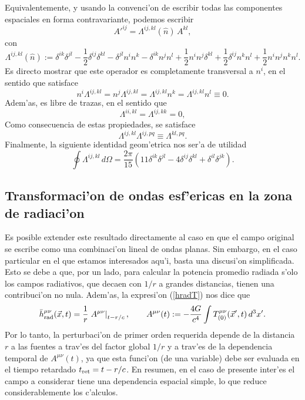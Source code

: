 Equivalentemente, y usando la convenci'on de escribir todas las componentes espaciales en forma contravariante, podemos escribir
\begin{equation}
A'^{ij}=\Lambda^{ij,kl}(\hat{n})\,A^{kl},
\end{equation}
con
\begin{equation}
\Lambda^{ij,kl}(\hat{n}):=\delta^{ik}\delta^{jl}-\frac{1}{2}\delta^{ij}\delta^{kl}-\delta^{jl}n^in^k-\delta^{ik}n^jn^l
+\frac{1}{2}n^in^j\delta^{kl} +\frac{1}{2}\delta^{ij}n^kn^l +\frac{1}{2}n^in^jn^kn^l .
\end{equation}
Es directo mostrar que este operador es completamente transversal a $n^i$, en el sentido que satisface
\begin{equation}
n^i\Lambda^{ij,kl}=n^j\Lambda^{ij,kl}=\Lambda^{ij,kl}n^k=\Lambda^{ij,kl}n^l\equiv 0.
\end{equation}
Adem'as, es libre de trazas, en el sentido que
\begin{equation}
\Lambda^{ii,kl}=\Lambda^{ij,kk}=0,
\end{equation}
Como consecuencia de estas propiedades, se satisface
\begin{equation}\label{LLL}
\Lambda^{ij,kl}\Lambda^{ij,pq}\equiv \Lambda^{kl,pq}.
\end{equation}
Finalmente, la siguiente identidad geom'etrica nos ser'a de utilidad
\begin{equation}\label{intL}
\oint\Lambda^{ij,kl}\,d\Omega=\frac{2\pi}{15}\left(11\delta^{ik}\delta^{jl}-4\delta^{ij}\delta^{kl}+\delta^{il}\delta^{jk}\right).
\end{equation}

\subsection{Transformaci'on de ondas esf'ericas en la zona de radiaci'on}\label{sec:TOER}

Es posible extender este resultado directamente al caso en que el campo original se escribe como una combinaci'on lineal de ondas planas. Sin embargo, en el caso particular en el que estamos interesados aqu'i, basta una discusi'on simplificada. Esto se debe a que, por un lado, para calcular la potencia promedio radiada s'olo los campos radiativos, que decaen con $1/r$ a grandes distancias, tienen una contribuci'on no nula. Adem'as, la expresi'on (\ref{hradT}) nos dice que
\begin{equation}\label{hradf}
\bar{h}_{\rm rad}^{\mu\nu}(\vec{x},t)= \frac{1}{r}\left.A^{\mu\nu}\right|_{t-r/c}, \qquad A^{\mu\nu}(t):=-\frac{4G}{c^4}\int T^{\mu\nu}_{(0)}(\vec{x}',t)\, d^3x'.
\end{equation}
Por lo tanto, la perturbaci'on de primer orden requerida depende de la distancia $r$ a las fuentes a trav'es del factor global $1/r$ y a trav'es de la dependencia temporal de $A^{\mu\nu}(t)$, ya que esta funci'on (de una variable) debe ser evaluada en el tiempo retardado $t_{\rm ret}=t-r/c$. En resumen, en el caso de presente inter'es el campo a considerar tiene una dependencia espacial simple, lo que reduce considerablemente los c'alculos.

